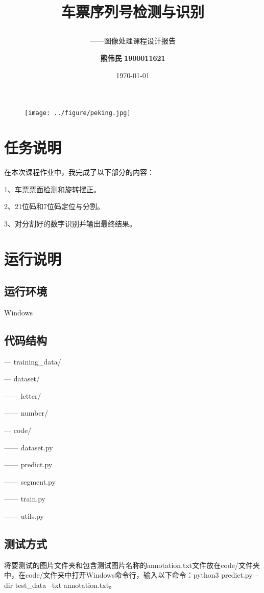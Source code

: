 \documentclass[11pt]{ctexart}
\title{\LARGE \textbf{车票序列号检测与识别} \\ \subtitle{——图像处理课程设计报告}}
\author{\Large \textbf{熊伟民} \quad \textbf{1900011621}}
\date{\Large \today}
\begin{document}
	\maketitle
	
	\begin{figure}[h]
		\centering
	 	\texttt{[image: ../figure/peking.jpg]}
	\end{figure}
	
	\renewcommand{\contentsname}{目录(Contents)}
	\renewcommand{\algorithmicrequire}{\textbf{Input:}}
	\renewcommand{\algorithmicensure}{\textbf{Output:}}
	
	\tableofcontents
	
	\thispagestyle{empty}
	
	\newpage
	
	\setcounter{page}{1}
	
	\section{任务说明}
	在本次课程作业中，我完成了以下部分的内容：
	
	1、车票票面检测和旋转摆正。
	
	2、21位码和7位码定位与分割。
	
	3、对分割好的数字识别并输出最终结果。
	
	\section{运行说明}
	
	\subsection{运行环境}
	Windows
	\subsection{代码结构}
	— \quad training\_data/
	
	— \quad dataset/
	
	—— \quad letter/
	
	—— \quad number/
	
	— \quad code/
	
	—— \quad dataset.py
	
	—— \quad predict.py
	
	—— \quad segment.py
	
	—— \quad train.py
	
	—— \quad utils.py
	
	\subsection{测试方式}
	将要测试的图片文件夹和包含测试图片名称的annotation.txt文件放在code/文件夹中，在code/文件夹中打开Windows命令行，输入以下命令：python3 predict.py --dir test\_data --txt annotation.txt。
	
\end{document}

